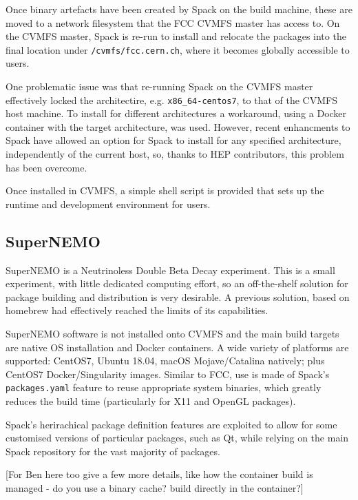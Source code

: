 \documentclass{webofc}
\begin{document}
Once binary artefacts have been created by Spack on the build machine,
these are moved to a network filesystem that the FCC CVMFS\cite{CVMFS} master
has access to. On the CVMFS master, Spack is re-run to install and relocate
the packages into the final location under \texttt{/cvmfs/fcc.cern.ch}, where
it becomes globally accessible to users.

One problematic issue was that re-running Spack on the CVMFS master effectively
locked the architectire, e.g. \texttt{x86\_64-centos7}, to that of the CVMFS
host machine. To install for different architectures a workaround, using a
Docker container with the target architecture, was used. However, recent
enhancments to Spack have allowed an option for Spack to install for any
specified architecture, independently of the current host, so, thanks to HEP
contributors, this problem has been overcome.

Once installed in CVMFS, a simple shell script is provided that sets up the
runtime and development environment for users.

\subsection{SuperNEMO}
\label{supernemo}

SuperNEMO\cite{Piquemal2006} is a Neutrinoless Double Beta Decay experiment.
This is a small experiment, with little dedicated computing effort, so
an off-the-shelf solution for package building and distribution is very 
desirable. A previous solution, based on homebrew\cite{homebrew} had effectively
reached the limits of its capabilities.

SuperNEMO software is not installed onto CVMFS and the main build targets are
native OS installation and Docker containers. A wide variety of platforms are
supported: CentOS7, Ubuntu 18.04, macOS Mojave/Catalina natively; plus CentOS7
Docker/Singularity images. Similar to FCC, use is made of Spack's
\texttt{packages.yaml} feature to reuse appropriate system binaries, which greatly
reduces the build time (particularly for X11 and OpenGL packages).

Spack's herirachical package definition features are exploited to allow for
some customised versions of particular packages, such as Qt, while relying on
the main Spack repository for the vast majority of packages.

[For Ben here too give a few more details, like how the container build is managed -
do you use a binary cache? build directly in the container?]
\end{document}
